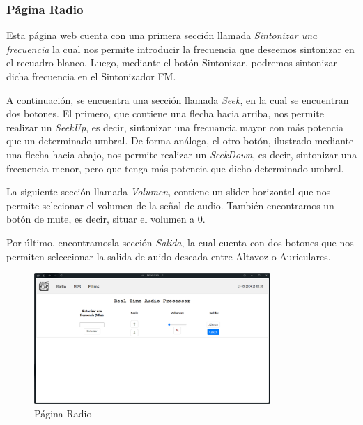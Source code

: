 \subsubsection{Página Radio}
Esta página web cuenta con una primera sección llamada \textit{Sintonizar una frecuencia} la cual nos permite introducir la frecuencia que deseemos sintonizar en el recuadro blanco. Luego, mediante el botón Sintonizar, podremos sintonizar dicha frecuencia en el Sintonizador FM.

A continuación, se encuentra una sección llamada \textit{Seek}, en la cual se encuentran dos botones. El primero, que contiene una flecha hacia arriba, nos permite realizar un \textit{SeekUp}, es decir, sintonizar una frecuancia mayor con más potencia que un determinado umbral. De forma análoga, el otro botón, ilustrado mediante una flecha hacia abajo, nos permite realizar un \textit{SeekDown}, es decir, sintonizar una frecuencia menor, pero que tenga más potencia que dicho determinado umbral.

La siguiente sección llamada \textit{Volumen}, contiene un slider horizontal que nos permite selecionar el volumen de la señal de audio. También encontramos un botón de mute, es decir, situar el volumen a 0.

Por último, encontramosla sección \textit{Salida}, la cual cuenta con dos botones que nos permiten seleccionar la salida de auido deseada entre Altavoz o Auriculares.

\begin{figure}[h]
    \centering
    \includegraphics[width=0.8\textwidth]{images/3/3-1/3-1-1-2/Pagina_Radio.png}
    \caption{Página Radio}
    \label{fig:3-1-1-2-Radio}
\end{figure}